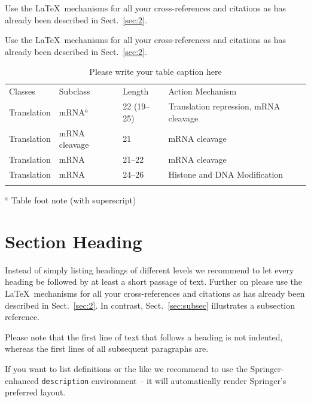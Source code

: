 \documentclass[graybox]{svmult}
\begin{document}
Use the \LaTeX\ mechanisms for all your cross-references and citations as has already been described in Sect.~\ref{sec:2}.

 Use the \LaTeX\ mechanisms for all your cross-refer\-ences and citations as has already been described in Sect.~\ref{sec:2}.
%
%
\begin{table}
\caption{Please write your table caption here}
\label{tab:1}       %
%
%
\begin{tabular}{p{2cm}p{2.4cm}p{2cm}p{4.9cm}}
\hline\noalign{\smallskip}
Classes & Subclass & Length & Action Mechanism  \\
\noalign{\smallskip}\svhline\noalign{\smallskip}
Translation & mRNA$^a$  & 22 (19--25) & Translation repression, mRNA cleavage\\
Translation & mRNA cleavage & 21 & mRNA cleavage\\
Translation & mRNA  & 21--22 & mRNA cleavage\\
Translation & mRNA  & 24--26 & Histone and DNA Modification\\
\noalign{\smallskip}\hline\noalign{\smallskip}
\end{tabular}
$^a$ Table foot note (with superscript)
\end{table}
%
\section{Section Heading}
\label{sec:3}
Instead of simply listing headings of different levels we recommend to
let every heading be followed by at least a short passage of text.
Further on please use the \LaTeX\ mechanisms for all your
cross-references and citations as has already been described in
Sect.~\ref{sec:2}.
In contrast, Sect.~\ref{sec:subsec} illustrates a subsection reference.

Please note that the first line of text that follows a heading is not indented, whereas the first lines of all subsequent paragraphs are.

If you want to list definitions or the like we recommend to use the Springer-enhanced \verb|description| environment -- it will automatically render Springer's preferred layout.
\end{document}
